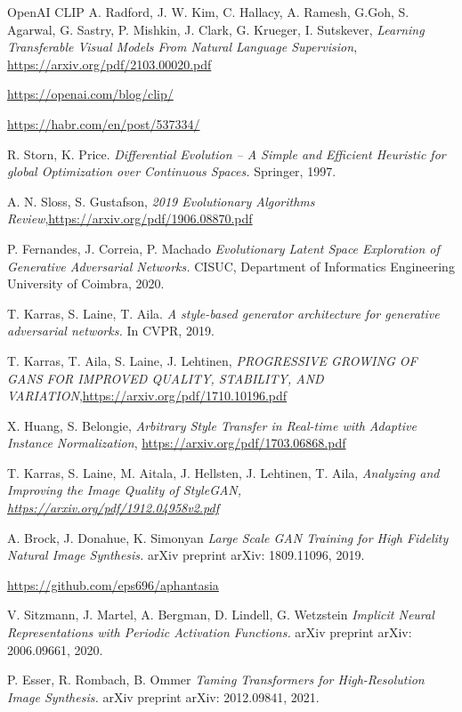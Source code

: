 \documentclass[11pt,a4paper,openany]{book}
\begin{document}
\begin{thebibliography}{a,b,c}
 OpenAI CLIP A. Radford, J. W. Kim, C. Hallacy, A. Ramesh, G.Goh, S. Agarwal, G. Sastry, P. Mishkin, J. Clark, G. Krueger, I. Sutskever, {\it Learning Transferable Visual Models From Natural Language Supervision}, \url{https://arxiv.org/pdf/2103.00020.pdf}

 \url{https://openai.com/blog/clip/}

 \url{https://habr.com/en/post/537334/}

 R. Storn, K. Price. {\it Differential Evolution – A Simple and Efficient Heuristic for global Optimization over Continuous Spaces.} Springer, 1997.

 A. N. Sloss, S. Gustafson, {\it 2019 Evolutionary Algorithms Review},\url{https://arxiv.org/pdf/1906.08870.pdf}

 P. Fernandes, J. Correia, P. Machado {\it Evolutionary Latent Space Exploration of Generative Adversarial Networks.} CISUC, Department of Informatics Engineering University of Coimbra, 2020.

 T. Karras, S. Laine, T. Aila. {\it A style-based generator architecture for generative adversarial networks.} In CVPR, 2019.

 T. Karras,  T. Aila, S. Laine, J. Lehtinen, {\it PROGRESSIVE GROWING OF GANS FOR IMPROVED
QUALITY, STABILITY, AND VARIATION},\url{https://arxiv.org/pdf/1710.10196.pdf}

 X. Huang, S. Belongie, {\it Arbitrary Style Transfer in Real-time with Adaptive Instance Normalization}, \url{https://arxiv.org/pdf/1703.06868.pdf}

 T. Karras, S. Laine, M. Aitala, J. Hellsten, J. Lehtinen, T. Aila, \it{Analyzing and Improving the Image Quality of StyleGAN}, \url{https://arxiv.org/pdf/1912.04958v2.pdf}

 A. Brock, J. Donahue, K. Simonyan {\it Large Scale GAN Training for High Fidelity Natural Image Synthesis.} arXiv preprint arXiv: 1809.11096, 2019.

 \url{https://github.com/eps696/aphantasia}

 V. Sitzmann, J. Martel, A. Bergman, D. Lindell, G. Wetzstein {\it Implicit Neural Representations with Periodic Activation Functions.} arXiv preprint arXiv: 2006.09661, 2020.

 P. Esser, R. Rombach, B. Ommer {\it Taming Transformers for High-Resolution Image Synthesis.} arXiv preprint arXiv: 2012.09841, 2021.


\end{thebibliography}
\end{document}
